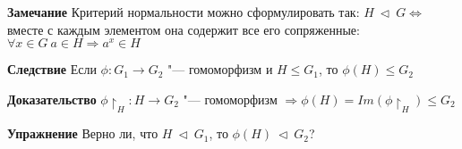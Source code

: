\documentclass{article}
\begin{document}
\vspace{10pt}

\textbf{Замечание} Критерий нормальности можно сформулировать так: $H \  \triangleleft \  G \Leftrightarrow$ вместе с каждым элементом она содержит все его сопряженные: $\forall x \in G \  a \in H \Rightarrow a^x \in H$

\vspace{10pt}

\textbf{Следствие}
Если $\phi: G_1 \rightarrow G_2$ "--- гомоморфизм и $H \leq G_1$, то $\phi(H) \leq G_2$

\textbf{Доказательство}
$\phi \! \restriction_H  : H \rightarrow G_2$ "--- гомоморфизм $\Rightarrow \phi(H) = Im(\phi \! \restriction_H) \leq G_2$

\vspace{10pt}

\textbf{Упражнение} Верно ли, что $H \  \triangleleft \  G_1$, то $\phi(H) \  \triangleleft \  G_2$?
\end{document}
